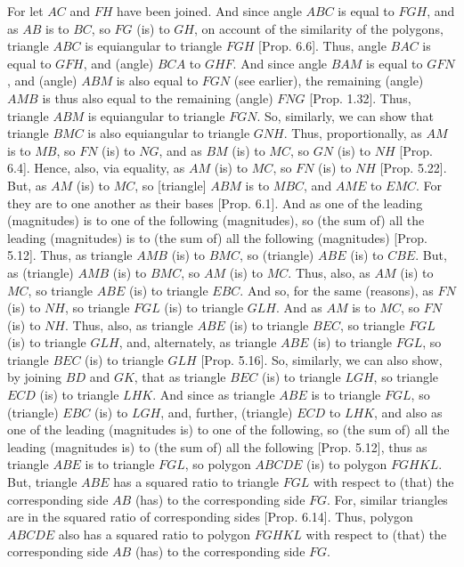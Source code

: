 \begin{Parallel}{}{}
{For let $AC$ and $FH$ have been joined. And since angle $ABC$ is
equal to $FGH$,  and
as $AB$ is to $BC$, so $FG$ (is) to $GH$, on account of the similarity of the polygons,  triangle $ABC$ is equiangular to triangle
$FGH$ [Prop. 6.6]. Thus, angle $BAC$ is equal 
to $GFH$, and (angle) $BCA$ to $GHF$. And since angle $BAM$ is equal to 
$GFN$, and (angle) $ABM$ is also equal to $FGN$ (see earlier), the remaining (angle) $AMB$ is
thus also equal to the remaining (angle) $FNG$  [Prop. 1.32]. 
Thus, triangle $ABM$ is equiangular to triangle $FGN$. So, similarly, we can
show that triangle $BMC$ is also equiangular to triangle $GNH$. Thus, proportionally,
as $AM$ is to $MB$, so $FN$ (is) to $NG$, and as $BM$ (is) to $MC$, so $GN$ (is) to
$NH$ [Prop. 6.4]. Hence, also, via equality,
as $AM$ (is) to $MC$, so $FN$ (is) to $NH$ 
[Prop. 5.22]. But, as $AM$ (is) to $MC$,
so [triangle] $ABM$ is to $MBC$, and $AME$ to $EMC$. For they are to one another
 as their bases  [Prop. 6.1]. And as one
 of the leading (magnitudes) is to one of the following (magnitudes), so
    (the sum of) all the leading (magnitudes) is to (the sum of) all the following (magnitudes)
[Prop. 5.12]. Thus, as triangle $AMB$
 (is) to $BMC$, so (triangle) $ABE$ (is) to $CBE$. But, as (triangle) $AMB$ (is) to
 $BMC$, so $AM$ (is) to $MC$. Thus, also, as $AM$ (is) to $MC$, so 
triangle $ABE$
 (is) to triangle $EBC$. And so, for the same (reasons), as $FN$ (is) to $NH$,
 so triangle $FGL$  (is) to triangle $GLH$. And as $AM$ is to $MC$, so $FN$ (is) to
 $NH$. Thus, also, as triangle $ABE$ (is) to triangle $BEC$, so triangle $FGL$
 (is) to triangle $GLH$, and, alternately, as triangle $ABE$ (is) to triangle
 $FGL$, so triangle $BEC$ (is) to triangle $GLH$  [Prop. 5.16]. So, similarly, we can also show, by
 joining $BD$ and $GK$, that  as triangle $BEC$ (is) to triangle $LGH$,
 so triangle $ECD$ (is) to triangle $LHK$. And since as triangle $ABE$ is
 to triangle $FGL$, so (triangle) $EBC$ (is) to $LGH$, and, further, (triangle)
 $ECD$ to $LHK$, and also as one of the leading (magnitudes is) to one
 of the following, so (the sum of) all the leading (magnitudes is) to (the sum of) all the
 following [Prop. 5.12], thus as triangle
 $ABE$ is to triangle $FGL$, so polygon $ABCDE$ (is) to polygon
 $FGHKL$. But, triangle $ABE$ has a squared ratio to triangle $FGL$ with
 respect to (that) the corresponding side $AB$ (has) to the corresponding side
 $FG$. For, similar triangles are in the squared ratio of corresponding sides 
[Prop. 6.14]. Thus, polygon
$ABCDE$ also has a squared ratio to polygon $FGHKL$ with respect to
(that) the corresponding side $AB$ (has) to the corresponding side
$FG$.

}
\end{Parallel}
